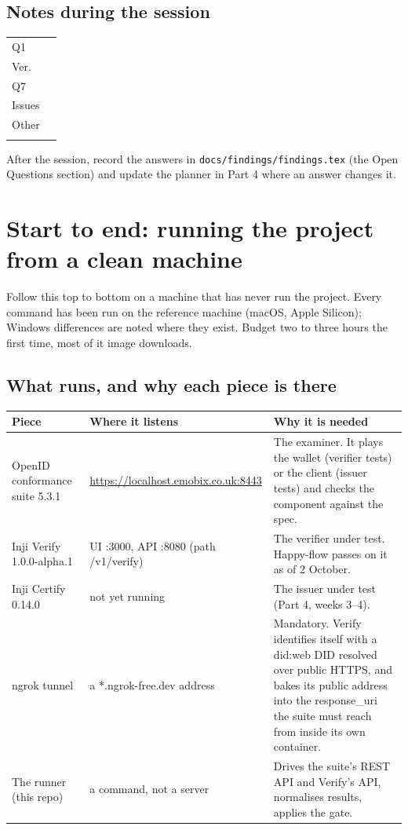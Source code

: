\documentclass[10pt,a4paper]{article}
\newcommand{\us}{\_}
\begin{document}
\subsection{Notes during the session}

\vspace{0.3em}
\begin{tabular}{@{}p{1.4cm}p{14.6cm}@{}}
Q1 & \hrulefill\\[1.1em]
Ver. & \hrulefill\\[1.1em]
Q7 & \hrulefill\\[1.1em]
Issues & \hrulefill\\[1.1em]
Other & \hrulefill\\[1.1em]
 & \hrulefill\\
\end{tabular}

After the session, record the answers in \texttt{docs/findings/findings.tex} (the Open
Questions section) and update the planner in Part 4 where an answer changes it.

\newpage
\section{Start to end: running the project from a clean machine}

Follow this top to bottom on a machine that has never run the project. Every command has
been run on the reference machine (macOS, Apple Silicon); Windows differences are noted
where they exist. Budget two to three hours the first time, most of it image downloads.

\subsection{What runs, and why each piece is there}

\begin{longtable}{@{}p{3.4cm}p{5.8cm}p{6.6cm}@{}}
\toprule
Piece & Where it listens & Why it is needed\\
\midrule
\endhead
OpenID conformance suite 5.3.1 & \url{https://localhost.emobix.co.uk:8443} & The examiner. It plays
the wallet (verifier tests) or the client (issuer tests) and checks the component against
the spec.\\
Inji Verify 1.0.0-alpha.1 & UI :3000, API :8080 (path /v1/verify) & The verifier under test. Happy-flow passes on it as of 2 October.\\
Inji Certify 0.14.0 & not yet running & The issuer under test (Part 4, weeks 3--4).\\
ngrok tunnel & a *.ngrok-free.dev address & Mandatory. Verify identifies itself with a
did:web DID resolved over public HTTPS, and bakes its public address into the response\us{}uri
the suite must reach from inside its own container.\\
The runner (this repo) & a command, not a server & Drives the suite's REST API and
Verify's API, normalises results, applies the gate.\\
\bottomrule
\end{longtable}
\end{document}
